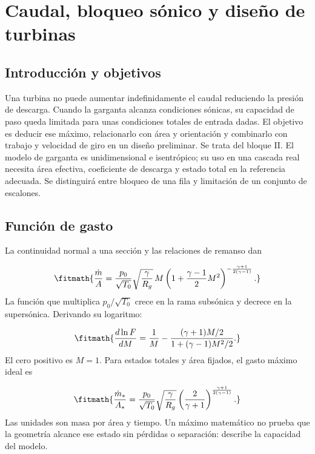 \documentclass[10pt,openany]{book}
\begin{document}
\studiumchaptercheck

\chapter{Caudal, bloqueo sónico y diseño de turbinas}
\label{chap:c06}


\section{Introducción y objetivos}

Una turbina no puede aumentar indefinidamente el caudal reduciendo la presión de descarga. Cuando la garganta alcanza condiciones sónicas, su capacidad de paso queda limitada para unas condiciones totales de entrada dadas. El objetivo es deducir ese máximo, relacionarlo con área y orientación y combinarlo con trabajo y velocidad de giro en un diseño preliminar.
Se trata del bloque II. El modelo de garganta es unidimensional e isentrópico; su uso en una cascada real necesita área efectiva, coeficiente de descarga y estado total en la referencia adecuada. Se distinguirá entre bloqueo de una fila y limitación de un conjunto de escalones.

\section{Función de gasto}


La continuidad normal a una sección y las relaciones de remanso dan



\[
\fitmath{\frac{\dot m}{A}=\frac{p_0}{\sqrt{T_0}}\sqrt{\frac{\gamma}{R_g}}\,M\left(1+\frac{\gamma-1}{2}M^2\right)^{-\frac{\gamma+1}{2(\gamma-1)}}.}
\]
La función que multiplica \(p_0/\sqrt{T_0}\) crece en la rama subsónica y decrece en la supersónica. Derivando su logaritmo:

\[
\fitmath{\frac{d\ln F}{dM}=\frac1M-\frac{(\gamma+1)M/2}{1+(\gamma-1)M^2/2}.}
\]
El cero positivo es \(M=1\). Para estados totales y área fijados, el gasto máximo ideal es

\[
\fitmath{\frac{\dot m_*}{A_*}=\frac{p_0}{\sqrt{T_0}}\sqrt{\frac{\gamma}{R_g}}\left(\frac{2}{\gamma+1}\right)^{\frac{\gamma+1}{2(\gamma-1)}}.}
\]
Las unidades son masa por área y tiempo. Un máximo matemático no prueba que la geometría alcance ese estado sin pérdidas o separación: describe la capacidad del modelo.
\end{document}
